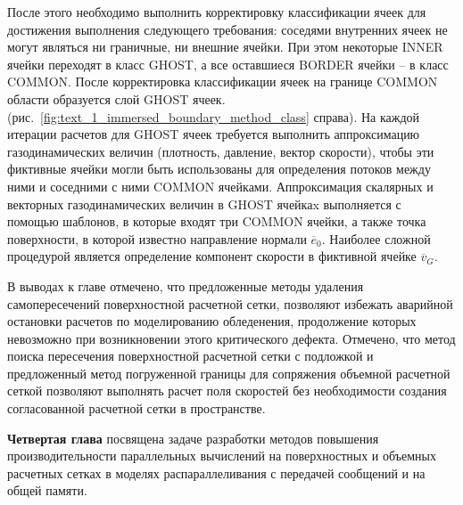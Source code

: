 \documentclass[a4paper,14pt]{extarticle}                     %
\theoremstyle{plain}                                         %
\begin{document}
После этого необходимо выполнить корректировку классификации ячеек для достижения выполнения следующего требования: соседями внутренних ячеек не могут являться ни граничные, ни внешние ячейки.
При этом некоторые INNER ячейки переходят в класс GHOST, а все оставшиеся BORDER ячейки -- в класс COMMON.
После корректировка классификации ячеек на границе COMMON области образуется слой GHOST ячеек. (рис.~\ref{fig:text_1_immersed_boundary_method_class} справа).
На каждой итерации расчетов для GHOST ячеек требуется выполнить аппроксимацию газодинамических величин (плотность, давление, вектор скорости), чтобы эти фиктивные ячейки могли быть использованы для определения потоков между ними и соседними с ними COMMON ячейками.
Аппроксимация скалярных и векторных газодинамических величин в GHOST ячейкаx выполняется с помощью шаблонов, в которые входят три COMMON ячейки, а также точка поверхности, в которой известно направление нормали $\overline{e}_0$.
Наиболее сложной процедурой является определение компонент скорости в фиктивной ячейке $\overline{v}_G$.

В выводах к главе отмечено, что предложенные методы удаления самопересечений поверхностной расчетной сетки, позволяют избежать аварийной остановки расчетов по моделированию обледенения, продолжение которых невозможно при возникновении этого критического дефекта.
Отмечено, что метод поиска пересечения поверхностной расчетной сетки с подложкой и предложенный метод погруженной границы для сопряжения объемной расчетной сеткой позволяют выполнять расчет поля скоростей без необходимости создания согласованной расчетной сетки в пространстве.


\textbf{Четвертая глава} посвящена задаче разработки методов повышения производительности параллельных вычислений на поверхностных и объемных расчетных сетках в моделях распараллеливания с передачей сообщений и на общей памяти.

\end{document}
